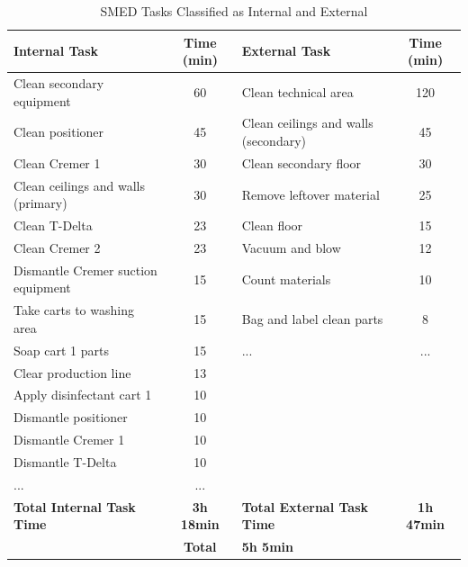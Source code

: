 \begin{table}[H]
\centering
\caption{SMED Tasks Classified as Internal and External}
\label{tbl:SMED_Internal_External}

\setlength{\tabcolsep}{3pt}

\begin{tabularx}{\textwidth}{p{5.5cm}c p{5.5cm}c}
\toprule
\textbf{Internal Task} & \textbf{Time (min)} & \textbf{External Task} & \textbf{Time (min)} \\
\midrule
Clean secondary equipment & 60 & Clean technical area & 120 \\
Clean positioner & 45 & Clean ceilings and walls (secondary) & 45 \\
Clean Cremer 1 & 30 & Clean secondary floor & 30 \\
Clean ceilings and walls (primary) & 30 & Remove leftover material & 25 \\
Clean T-Delta & 23 & Clean floor & 15 \\
Clean Cremer 2 & 23 & Vacuum and blow & 12 \\
Dismantle Cremer suction equipment & 15 & Count materials & 10 \\
Take carts to washing area & 15 & Bag and label clean parts & 8 \\
Soap cart 1 parts & 15 & \huge{...} & \huge{...}\\
Clear production line & 13 &  &  \\
Apply disinfectant cart 1 & 10 &  &  \\
Dismantle positioner & 10 &  &  \\
Dismantle Cremer 1 & 10 &  &  \\
Dismantle T-Delta & 10 &  &  \\
\huge{...} & \huge{...} & & \\
\midrule
\textbf{Total Internal Task Time} & \textbf{3h 18min} & \textbf{Total External Task Time} & \textbf{1h 47min} \\
\midrule
 & \textbf{Total} & \textbf{5h 5min} &  \\
\bottomrule
\end{tabularx}
\end{table}


